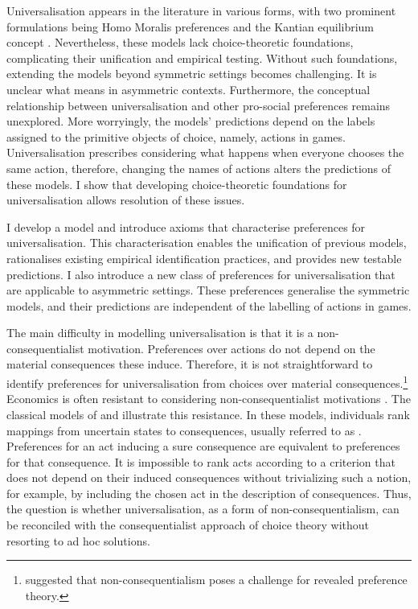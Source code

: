 Universalisation appears in the literature in various forms, with two prominent formulations being Homo Moralis preferences \citep{algerHomoMoralisPreference2013} and the Kantian equilibrium concept \citep{roemer2019cooperate}. Nevertheless, these models lack choice-theoretic foundations, complicating their unification and empirical testing. Without such foundations, extending the models beyond symmetric settings becomes challenging. It is unclear what  means in asymmetric contexts. Furthermore, the conceptual relationship between universalisation and other pro-social preferences remains unexplored. More worryingly, the models' predictions depend on the labels assigned to the primitive objects of choice, namely, actions in games. Universalisation prescribes considering what happens when everyone chooses the same action, therefore, changing the names of actions alters the predictions of these models. I show that developing choice-theoretic foundations for universalisation allows resolution of these issues.

I develop a model and introduce axioms that characterise preferences for universalisation. This characterisation enables the unification of previous models, rationalises existing empirical identification practices, and provides new testable predictions. I also introduce a new class of preferences for universalisation that are applicable to asymmetric settings. These preferences generalise the symmetric models, and their predictions are independent of the labelling of actions in games.

The main difficulty in modelling universalisation is that it is a non-consequentialist motivation. Preferences over actions do not depend on the material consequences these induce. Therefore, it is not straightforward to identify preferences for universalisation from choices over material consequences.\footnote{\cite{senBehaviourConceptPreference1973} suggested that non-consequentialism poses a challenge for revealed preference theory.} Economics is often resistant to considering non-consequentialist motivations \citep{fleurbaeyEconomicTheoriesJustice2019}. The classical models of \cite{anscombeDefinitionSubjectiveProbability1963} and \cite{savageFoundationsStatistics1972} illustrate this resistance. In these models, individuals rank mappings from uncertain states to consequences, usually referred to as . Preferences for an act inducing a sure consequence are equivalent to preferences for that consequence. It is impossible to rank acts according to a criterion that does not depend on their induced consequences without trivializing such a notion, for example, by including the chosen act in the description of consequences. Thus, the question is whether universalisation, as a form of non-consequentialism, can be reconciled with the consequentialist approach of choice theory without resorting to ad hoc solutions.

